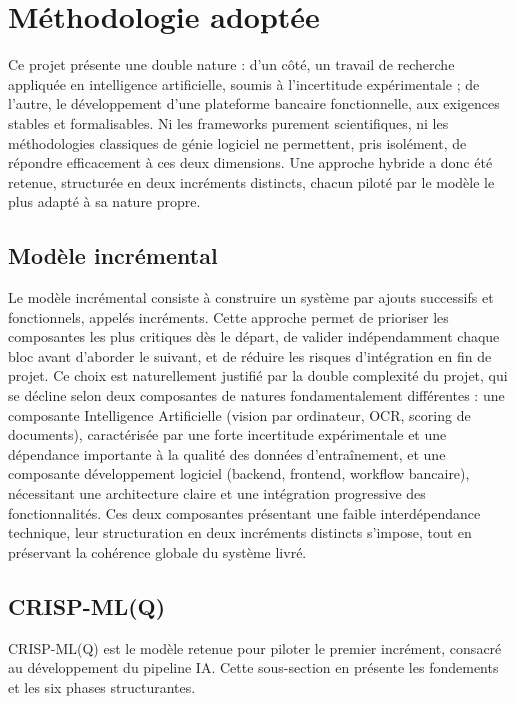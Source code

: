 \section{Méthodologie adoptée }
\label{sec:methodologie}

Ce projet présente une double nature : d'un côté, un travail de recherche appliquée en intelligence artificielle, soumis à l'incertitude expérimentale ; de l'autre, le développement d'une plateforme bancaire fonctionnelle, aux exigences stables et formalisables. Ni les frameworks purement scientifiques, ni les méthodologies classiques de génie logiciel ne permettent, pris isolément, de répondre efficacement à ces deux dimensions. Une approche hybride a donc été retenue, structurée en deux incréments distincts, chacun piloté par le modèle le plus adapté à sa nature propre.

\subsection{Modèle incrémental}
\label{subsec:modele-incremental}

Le modèle incrémental consiste à construire un système par ajouts successifs et fonctionnels, appelés incréments. Cette approche permet de prioriser les composantes les plus critiques dès le départ, de valider indépendamment chaque bloc avant d'aborder le suivant, et de réduire les risques d'intégration en fin de projet. Ce choix est naturellement justifié par la double complexité du projet, qui se décline selon deux composantes de natures fondamentalement différentes : une composante Intelligence Artificielle (vision par ordinateur, OCR, scoring de documents), caractérisée par une forte incertitude expérimentale et une dépendance importante à la qualité des données d'entraînement, et une composante développement logiciel (backend, frontend, workflow bancaire), nécessitant une architecture claire et une intégration progressive des fonctionnalités. Ces deux composantes présentant une faible interdépendance technique, leur structuration en deux incréments distincts s'impose, tout en préservant la cohérence globale du système livré.

\subsection{CRISP-ML(Q)}
\label{subsec:crisp-mlq}

CRISP-ML(Q) est le modèle retenue pour piloter le premier incrément, consacré au développement du pipeline IA. Cette sous-section en présente les fondements et les six phases structurantes.

